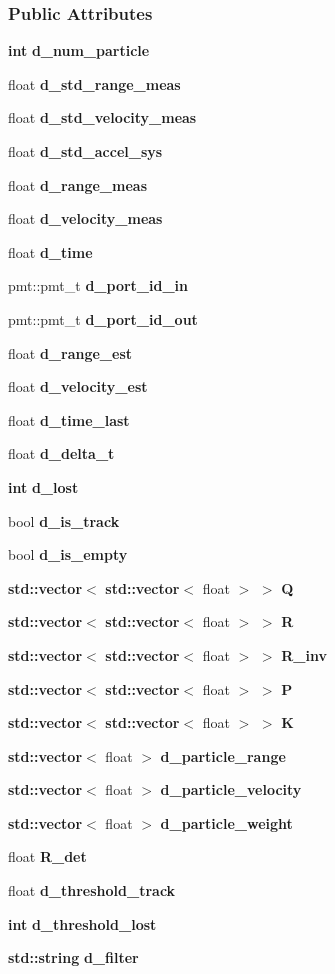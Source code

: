 \subsubsection*{Public Attributes}
\begin{DoxyCompactItemize}
\item 
{\bf int} {\bf d\+\_\+num\+\_\+particle}
\item 
float {\bf d\+\_\+std\+\_\+range\+\_\+meas}
\item 
float {\bf d\+\_\+std\+\_\+velocity\+\_\+meas}
\item 
float {\bf d\+\_\+std\+\_\+accel\+\_\+sys}
\item 
float {\bf d\+\_\+range\+\_\+meas}
\item 
float {\bf d\+\_\+velocity\+\_\+meas}
\item 
float {\bf d\+\_\+time}
\item 
pmt\+::pmt\+\_\+t {\bf d\+\_\+port\+\_\+id\+\_\+in}
\item 
pmt\+::pmt\+\_\+t {\bf d\+\_\+port\+\_\+id\+\_\+out}
\item 
float {\bf d\+\_\+range\+\_\+est}
\item 
float {\bf d\+\_\+velocity\+\_\+est}
\item 
float {\bf d\+\_\+time\+\_\+last}
\item 
float {\bf d\+\_\+delta\+\_\+t}
\item 
{\bf int} {\bf d\+\_\+lost}
\item 
bool {\bf d\+\_\+is\+\_\+track}
\item 
bool {\bf d\+\_\+is\+\_\+empty}
\item 
{\bf std\+::vector}$<$ {\bf std\+::vector}$<$ float $>$ $>$ {\bf Q}
\item 
{\bf std\+::vector}$<$ {\bf std\+::vector}$<$ float $>$ $>$ {\bf R}
\item 
{\bf std\+::vector}$<$ {\bf std\+::vector}$<$ float $>$ $>$ {\bf R\+\_\+inv}
\item 
{\bf std\+::vector}$<$ {\bf std\+::vector}$<$ float $>$ $>$ {\bf P}
\item 
{\bf std\+::vector}$<$ {\bf std\+::vector}$<$ float $>$ $>$ {\bf K}
\item 
{\bf std\+::vector}$<$ float $>$ {\bf d\+\_\+particle\+\_\+range}
\item 
{\bf std\+::vector}$<$ float $>$ {\bf d\+\_\+particle\+\_\+velocity}
\item 
{\bf std\+::vector}$<$ float $>$ {\bf d\+\_\+particle\+\_\+weight}
\item 
float {\bf R\+\_\+det}
\item 
float {\bf d\+\_\+threshold\+\_\+track}
\item 
{\bf int} {\bf d\+\_\+threshold\+\_\+lost}
\item 
{\bf std\+::string} {\bf d\+\_\+filter}
\end{DoxyCompactItemize}
